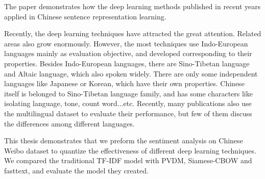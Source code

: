 \begin{abstractEN}

The paper demonstrates how the deep learning methods published in recent years applied in Chinese sentence representation learning.

Recently, the deep learning techniques have attracted the great attention. Related areas also grow enormously. 
However, the most techniques use Indo-European languages mainly as evaluation objective, and developed corresponding to their properties.  
Besides Indo-European languages, there are Sino-Tibetan language and Altaic language, which also spoken widely. 
There are only some independent languages like Japanese or Korean, which have their own properties.
Chinese itself is belonged to Sino-Tibetan language family, and has some characters like isolating language, tone, count word...etc.
Recently, many publications also use the multilingual dataset to evaluate their performance, but few of them discuss the differences among different languages. 

This thesis demonstrates that we preform the sentiment analysis on Chinese Weibo dataset to quantize the effectiveness of different deep learning techniques.
We compared the traditional TF-IDF model with PVDM, Siamese-CBOW and fasttext, and evaluate the model they created.

\end{abstractEN}

